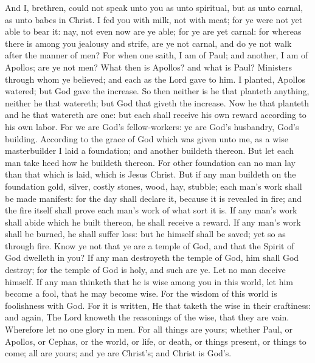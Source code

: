 And I, brethren, could not speak unto you as unto spiritual, but as unto carnal, as unto babes in Christ. I fed you with milk, not with meat; for ye were not yet able to bear it: nay, not even now are ye able; for ye are yet carnal: for whereas there is among you jealousy and strife, are ye not carnal, and do ye not walk after the manner of men? For when one saith, I am of Paul; and another, I am of Apollos; are ye not men? What then is Apollos? and what is Paul? Ministers through whom ye believed; and each as the Lord gave to him. I planted, Apollos watered; but God gave the increase. So then neither is he that planteth anything, neither he that watereth; but God that giveth the increase. Now he that planteth and he that watereth are one: but each shall receive his own reward according to his own labor. For we are God’s fellow-workers: ye are God’s husbandry, God’s building.  According to the grace of God which was given unto me, as a wise masterbuilder I laid a foundation; and another buildeth thereon. But let each man take heed how he buildeth thereon. For other foundation can no man lay than that which is laid, which is Jesus Christ. But if any man buildeth on the foundation gold, silver, costly stones, wood, hay, stubble; each man’s work shall be made manifest: for the day shall declare it, because it is revealed in fire; and the fire itself shall prove each man’s work of what sort it is. If any man’s work shall abide which he built thereon, he shall receive a reward. If any man’s work shall be burned, he shall suffer loss: but he himself shall be saved; yet so as through fire.  Know ye not that ye are a temple of God, and that the Spirit of God dwelleth in you? If any man destroyeth the temple of God, him shall God destroy; for the temple of God is holy, and such are ye.  Let no man deceive himself. If any man thinketh that he is wise among you in this world, let him become a fool, that he may become wise. For the wisdom of this world is foolishness with God. For it is written, He that taketh the wise in their craftiness: and again, The Lord knoweth the reasonings of the wise, that they are vain. Wherefore let no one glory in men. For all things are yours; whether Paul, or Apollos, or Cephas, or the world, or life, or death, or things present, or things to come; all are yours; and ye are Christ’s; and Christ is God’s. 

